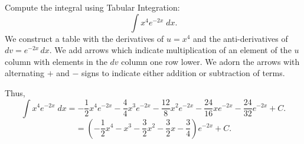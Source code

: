 \documentclass{ximera}
\begin{document}
\begin{example}
Compute the integral using Tabular Integration:
  \[
  \int x^4 e^{-2x} \;dx.
  \]
We construct a table with the derivatives of $u = x^4$ and the anti-derivatives of $dv = e^{-2x} \, dx$.
We add arrows which indicate multiplication of an element of the $u$ column with elements in the $dv$ column one row lower.
We adorn the arrows with alternating $+$ and $-$ signs to indicate either addition or subtraction of terms.
\begin{image}[5cm]
\end{image}

Thus,
\[
  \int x^4 e^{-2x} \;dx = -\frac12 x^4 e^{-2x} - \frac44x^3 e^{-2x} - \frac{12}{8} x^2 e^{-2x} - \frac{24}{16}x e^{-2x} - \frac{24}{32} e^{-2x} + C.
  \]
\[
= \left(-\frac12 x^4 - x^3  - \frac{3}{2} x^2  - \frac{3}{2}x  - \frac{3}{4}\right) e^{-2x} + C.
\]
\end{example}
\end{document}
